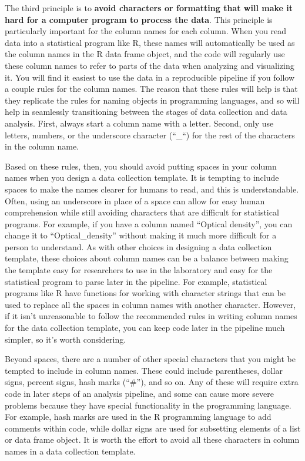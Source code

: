 \documentclass[]{tufte-book}
\begin{document}
The third principle is to \textbf{avoid characters or formatting that will make it
hard for a computer program to process the data}. This principle is
particularly important for the column names for each column. When you read data
into a statistical program like R, these names will automatically be used as the
column names in the R data frame object, and the code will regularly use these
column names to refer to parts of the data when analyzing and visualizing it.
You will find it easiest to use the data in a reproducible pipeline if you
follow a couple rules for the column names. The reason that these rules will help
is that they replicate the rules for naming objects in programming languages,
and so will help in seamlessly transitioning between the stages of data
collection and data analysis. First, always start a column name with a letter.
Second, only use letters, numbers, or the underscore character (``\_``) for
the rest of the characters in the column name.

Based on these rules, then, you should avoid putting spaces in your column names
when you design a data collection template. It is tempting to include spaces to
make the names clearer for humans to read, and this is understandable. Often,
using an underscore in place of a space can allow for easy human comprehension
while still avoiding characters that are difficult for statistical programs.
For example, if you have a column named ``Optical density'', you can change it
to ``Optical\_density'' without making it much more difficult for a person to
understand. As with other choices in designing a data collection template,
these choices about column names can be a balance between making the template
easy for researchers to use in the laboratory and easy for the statistical
program to parse later in the pipeline. For example, statistical programs like
R have functions for working with character strings that can be used to
replace all the spaces in column names with another character. However, if
it isn't unreasonable to follow the recommended rules in writing column names
for the data collection template, you can keep code later in the pipeline
much simpler, so it's worth considering.

Beyond spaces, there are a number of other special characters that you might
be tempted to include in column names. These could include parentheses, dollar signs,
percent signs, hash marks (``\#''), and so on. Any of these will require extra code
in later steps of an analysis pipeline, and some can cause more severe problems
because they have special functionality in the programming language. For example,
hash marks are used in the R programming language to add comments within code, while
dollar signs are used for subsetting elements of a list or data frame object.
It is worth the effort to avoid all these characters in column names in a data
collection template.
\end{document}
